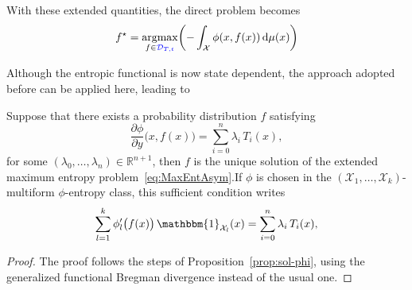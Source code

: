 \documentclass[entropy,article,submit,moreauthors,pdftex]{Definitions/mdpi}
\newcommand{\SZ}[1]{{\color{blue} #1}}                                       %
\def\dmu{\mathrm{d}\mu}%
\def\Rset{\mathbb{R}}%
\def\X{\mathcal{X}}%
\def\D{\mathcal{D}}%
\def\un{\mathbbm{1}}%
\DeclareMathOperator*{\argmax}{\operatorname{argmax}}%
\begin{document}
With these extended quantities, the direct problem becomes
%
\begin{equation}\label{eq:MaxEntAsym}
f^\star = \argmax_{f \in \SZ{\D_{T,t}}} \left( - \int_\X \phi(x,f(x)) \, \dmu(x) \right)
\end{equation}

Although the  entropic functional is  now state dependent, the  approach adopted
before can be applied here, leading to

\begin{Proposition}
\label{prop:sol-asym_phi}
%
  Suppose that there exists a probability distribution $f$ satisfying
  \begin{equation}\label{eq:sol-asym_phi}
  \frac{\partial \phi}{\partial y}\big(x,f(x)\big) = \sum_{i=0}^n \lambda_i \,
  T_i(x),
  \end{equation}
  for  some  $(\lambda_0,\ldots,\lambda_n) \in  \Rset^{n+1}$,  then  $f$ is  the
  unique      solution      of       the      extended      maximum      entropy
  problem~\eqref{eq:MaxEntAsym}.\newline  If $\phi$  is chosen  in the  $(\X_1 ,
  \ldots  , \X_k)$-multiform  $\phi$-entropy  class,  this sufficient  condition
  writes
  \begin{equation}\label{eq:sol-multiform_phi}
  \sum_{l=1}^k \phi_l'\big(f(x)\big) \, \un_{\X_l}(x) = \sum_{i=0}^n \lambda_i
  \, T_i(x),
  \end{equation}
\end{Proposition}
%
\begin{proof}
  The  proof  follows the  steps  of  Proposition~\ref{prop:sol-phi}, using  the
  generalized functional Bregman divergence instead of the usual one.
\end{proof}
\end{document}
